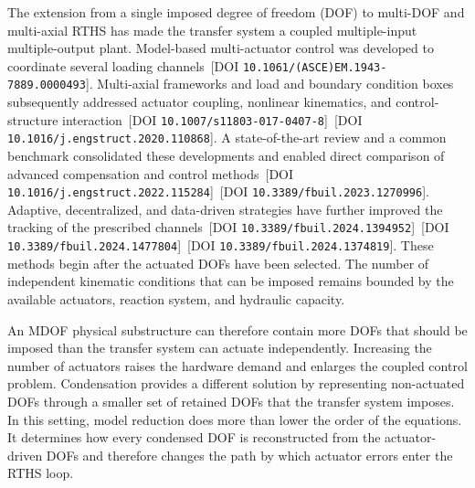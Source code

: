 \documentclass[11pt,a4paper]{article}
\numberwithin{equation}{section}
\begin{document}
The extension from a single imposed degree of freedom (DOF) to multi-DOF and multi-axial RTHS has made the transfer system a coupled multiple-input multiple-output plant. Model-based multi-actuator control was developed to coordinate several loading channels \cite{Phillips2013}\,[DOI \nolinkurl{10.1061/(ASCE)EM.1943-7889.0000493}]. Multi-axial frameworks and load and boundary condition boxes subsequently addressed actuator coupling, nonlinear kinematics, and control-structure interaction \cite{Fermandois2017}\,[DOI \nolinkurl{10.1007/s11803-017-0407-8}] \cite{Najafi2020}\,[DOI \nolinkurl{10.1016/j.engstruct.2020.110868}]. A state-of-the-art review and a common benchmark consolidated these developments and enabled direct comparison of advanced compensation and control methods \cite{Najafi2023}\,[DOI \nolinkurl{10.1016/j.engstruct.2022.115284}] \cite{Condori2023}\,[DOI \nolinkurl{10.3389/fbuil.2023.1270996}]. Adaptive, decentralized, and data-driven strategies have further improved the tracking of the prescribed channels \cite{Quiroz2024}\,[DOI \nolinkurl{10.3389/fbuil.2024.1394952}] \cite{RuizSong2024}\,[DOI \nolinkurl{10.3389/fbuil.2024.1477804}] \cite{Xu2024}\,[DOI \nolinkurl{10.3389/fbuil.2024.1374819}]. These methods begin after the actuated DOFs have been selected. The number of independent kinematic conditions that can be imposed remains bounded by the available actuators, reaction system, and hydraulic capacity.

An MDOF physical substructure can therefore contain more DOFs that should be imposed than the transfer system can actuate independently. Increasing the number of actuators raises the hardware demand and enlarges the coupled control problem. Condensation provides a different solution by representing non-actuated DOFs through a smaller set of retained DOFs that the transfer system imposes. In this setting, model reduction does more than lower the order of the equations. It determines how every condensed DOF is reconstructed from the actuator-driven DOFs and therefore changes the path by which actuator errors enter the RTHS loop.
\end{document}

